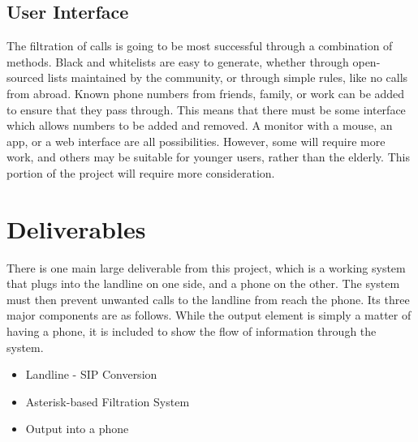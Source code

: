\documentclass[main.tex]{subfiles}
\begin{document}
\subsection{User Interface}
The filtration of calls is going to be most successful through a combination of methods. Black and whitelists are easy to generate, whether through open-sourced lists maintained by the community, or through simple rules, like no calls from abroad. Known phone numbers from friends, family, or work can be added to ensure that they pass through. This means that there must be some interface which allows numbers to be added and removed. A monitor with a mouse, an app, or a web interface are all possibilities. However, some will require more work, and others may be suitable for younger users, rather than the elderly. This portion of the project will require more consideration.

\section{Deliverables}
There is one main large deliverable from this project, which is a working system that plugs into the landline on one side, and a phone on the other. The system must then prevent unwanted calls to the landline from reach the phone. Its three major components are as follows. While the output element is simply a matter of having a phone, it is included to show the flow of information through the system.
\begin{itemize}
  \item Landline - SIP Conversion
  \item Asterisk-based Filtration System
  \item Output into a phone
\end{itemize}
\end{document}
